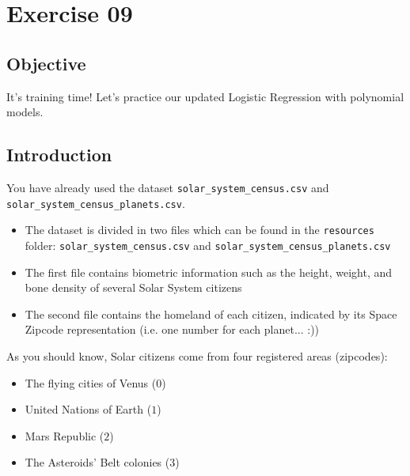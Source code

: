 \chapter{Exercise 09}
%
{}
\makeheaderfilesforbidden

\section*{Objective}
It's training time!
Let's practice our updated Logistic Regression with polynomial models.\\
\section*{Introduction}
You have already used the dataset \texttt{solar\_system\_census.csv} 
and \texttt{solar\_system\_census\_planets.csv}.\\
\begin{itemize}
	\item The dataset is divided in two files which can be found in the 
  \texttt{resources} folder: \texttt{solar\_system\_census.csv} and \texttt{solar\_system\_census\_planets.csv}
	\item The first file contains biometric information such as the height, weight, and bone density
   of several Solar System citizens
	\item The second file contains the homeland of each citizen, indicated by its 
  Space Zipcode representation (i.e. one number for each planet... :)) 
\end{itemize}
As you should know, Solar citizens come from four registered areas (zipcodes):\\

\begin{itemize}
	\item The flying cities of Venus ($0$)
	\item United Nations of Earth ($1$)
	\item Mars Republic ($2$)
	\item The Asteroids' Belt colonies ($3$)
\end{itemize}

